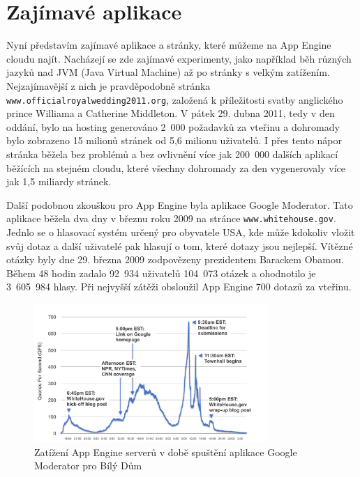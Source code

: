 \section{Zajímavé aplikace}
Nyní představím zajímavé aplikace a stránky, které můžeme na App Engine cloudu najít. Nacházejí se zde zajímavé experimenty, jako například běh různých jazyků nad JVM (Java Virtual Machine) až po stránky s velkým zatížením. Nejzajímavější z nich je pravděpodobně stránka \verb|www.officialroyalwedding2011.org|, založená k příležitosti svatby anglického prince Williama a Catherine Middleton. V pátek 29. dubna 2011, tedy v den oddání, bylo na hosting generováno 2~000 požadavků za vteřinu a dohromady bylo zobrazeno 15 milionů stránek od 5,6 milionu uživatelů. I přes tento nápor stránka běžela bez problémů a bez ovlivnění více jak 200~000 dalších aplikací běžících na stejném cloudu, které všechny dohromady za den vygenerovaly více jak 1,5 miliardy stránek. \cite{royal-wedding}

Další podobnou zkouškou pro App Engine byla aplikace Google Moderator. Tato aplikace běžela dva dny v březnu roku 2009 na stránce \verb|www.whitehouse.gov|. Jednlo se o hlasovací systém určený pro obyvatele USA, kde může kdokoliv vložit svůj dotaz a další uživatelé pak hlasují o tom, které dotazy jsou nejlepší. Vítězné otázky byly dne 29. března 2009 zodpovězeny prezidentem Barackem Obamou. Během 48 hodin zadalo 92~934 uživatelů 104~073 otázek a ohodnotilo je 3~605~984 hlasy. Při nejvyšší zátěži obsloužil App Engine 700 dotazů za vteřinu. \cite{whitehouse-app}

\begin{figure}[h]
\begin{center}
\includegraphics[width=3.5in]{figures/townhallgraphic.png}
\caption{Zatížení App Engine serverů v době spuštění aplikace Google Moderator pro Bílý Dům \cite{whitehouse-app}}
\label{fig:whitehouse-app-picutre}
\end{center}
\end{figure}

